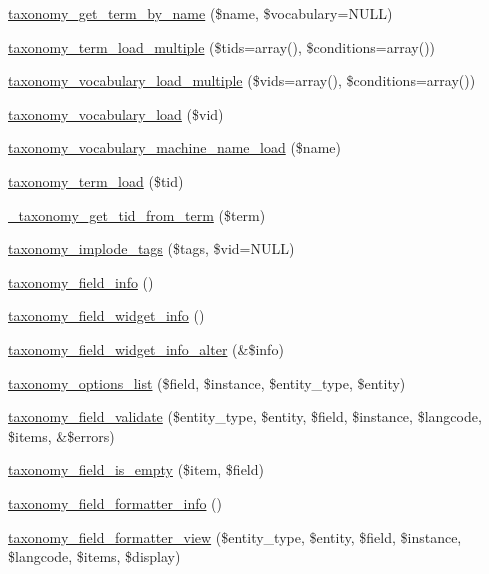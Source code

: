 \begin{DoxyCompactItemize}
\item 
\hyperlink{taxonomy_8module_aeba50f03c60d5bd29fff7579b2917081}{taxonomy\_\-get\_\-term\_\-by\_\-name} (\$name, \$vocabulary=NULL)
\item 
\hyperlink{taxonomy_8module_add67d5d48fc273cf997a650cfb376cda}{taxonomy\_\-term\_\-load\_\-multiple} (\$tids=array(), \$conditions=array())
\item 
\hyperlink{taxonomy_8module_aedb1343599759686a2701b067b75e1ea}{taxonomy\_\-vocabulary\_\-load\_\-multiple} (\$vids=array(), \$conditions=array())
\item 
\hyperlink{taxonomy_8module_ac9a55de2b9018930a690b7dde4f2ddb2}{taxonomy\_\-vocabulary\_\-load} (\$vid)
\item 
\hyperlink{taxonomy_8module_ae25133c12d174817672953ce9d0b297e}{taxonomy\_\-vocabulary\_\-machine\_\-name\_\-load} (\$name)
\item 
\hyperlink{taxonomy_8module_a0b2a6260c6d5938f6ea5a8b0a9b2db1e}{taxonomy\_\-term\_\-load} (\$tid)
\item 
\hyperlink{taxonomy_8module_a49288ce812a2d7b064e189eccc7d43a2}{\_\-taxonomy\_\-get\_\-tid\_\-from\_\-term} (\$term)
\item 
\hyperlink{taxonomy_8module_a848fd0e1b596605bee1563d953cac945}{taxonomy\_\-implode\_\-tags} (\$tags, \$vid=NULL)
\item 
\hyperlink{taxonomy_8module_a4461c7e3dddabd5e7b1272a8b38b4632}{taxonomy\_\-field\_\-info} ()
\item 
\hyperlink{taxonomy_8module_ad6d45fa8106c7ee50059ebf9e89b9268}{taxonomy\_\-field\_\-widget\_\-info} ()
\item 
\hyperlink{taxonomy_8module_a546dc92025f2ca5cca0311401a038c5e}{taxonomy\_\-field\_\-widget\_\-info\_\-alter} (\&\$info)
\item 
\hyperlink{taxonomy_8module_abe1a35a814483b668aeb2236c85dadff}{taxonomy\_\-options\_\-list} (\$field, \$instance, \$entity\_\-type, \$entity)
\item 
\hyperlink{taxonomy_8module_a370c4e737b4055bb0cf822a6be88a714}{taxonomy\_\-field\_\-validate} (\$entity\_\-type, \$entity, \$field, \$instance, \$langcode, \$items, \&\$errors)
\item 
\hyperlink{taxonomy_8module_ad4c934f62d87fa9be9f4e7d651226435}{taxonomy\_\-field\_\-is\_\-empty} (\$item, \$field)
\item 
\hyperlink{taxonomy_8module_a3fa5b9ed5faf023cc887627f8de00519}{taxonomy\_\-field\_\-formatter\_\-info} ()
\item 
\hyperlink{taxonomy_8module_a50532334c86372d1a56517ba5843de40}{taxonomy\_\-field\_\-formatter\_\-view} (\$entity\_\-type, \$entity, \$field, \$instance, \$langcode, \$items, \$display)

\end{DoxyCompactItemize}
